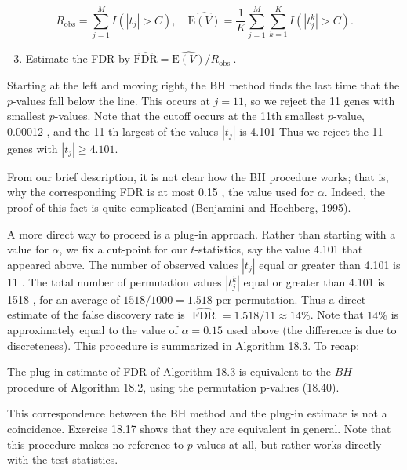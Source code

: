 \documentclass[10pt]{article}
\begin{document}
\begin{equation*}
R_{\mathrm{obs}}=\sum_{j=1}^{M} I\left(\left|t_{j}\right|>C\right), \quad \widehat{\mathrm{E}(V)}=\frac{1}{K} \sum_{j=1}^{M} \sum_{k=1}^{K} I\left(\left|t_{j}^{k}\right|>C\right) . \tag{18.46}
\end{equation*}


\begin{enumerate}
  \setcounter{enumi}{2}
  \item Estimate the FDR by $\widehat{\mathrm{FDR}}=\widehat{\mathrm{E}(V)} / R_{\text {obs }}$.
\end{enumerate}

Starting at the left and moving right, the BH method finds the last time that the $p$-values fall below the line. This occurs at $j=11$, so we reject the 11 genes with smallest $p$-values. Note that the cutoff occurs at the 11th smallest $p$-value, 0.00012 , and the 11 th largest of the values $\left|t_{j}\right|$ is 4.101 Thus we reject the 11 genes with $\left|t_{j}\right| \geq 4.101$.

From our brief description, it is not clear how the BH procedure works; that is, why the corresponding FDR is at most 0.15 , the value used for $\alpha$. Indeed, the proof of this fact is quite complicated (Benjamini and Hochberg, 1995).

A more direct way to proceed is a plug-in approach. Rather than starting with a value for $\alpha$, we fix a cut-point for our $t$-statistics, say the value 4.101 that appeared above. The number of observed values $\left|t_{j}\right|$ equal or greater than 4.101 is 11 . The total number of permutation values $\left|t_{j}^{k}\right|$ equal or greater than 4.101 is 1518 , for an average of $1518 / 1000=1.518$ per permutation. Thus a direct estimate of the false discovery rate is $\widehat{\text { FDR }}= 1.518 / 11 \approx 14 \%$. Note that $14 \%$ is approximately equal to the value of $\alpha=0.15$ used above (the difference is due to discreteness). This procedure is summarized in Algorithm 18.3. To recap:

The plug-in estimate of FDR of Algorithm 18.3 is equivalent to the $B H$ procedure of Algorithm 18.2, using the permutation p-values (18.40).

This correspondence between the BH method and the plug-in estimate is not a coincidence. Exercise 18.17 shows that they are equivalent in general. Note that this procedure makes no reference to $p$-values at all, but rather works directly with the test statistics.
\end{document}
